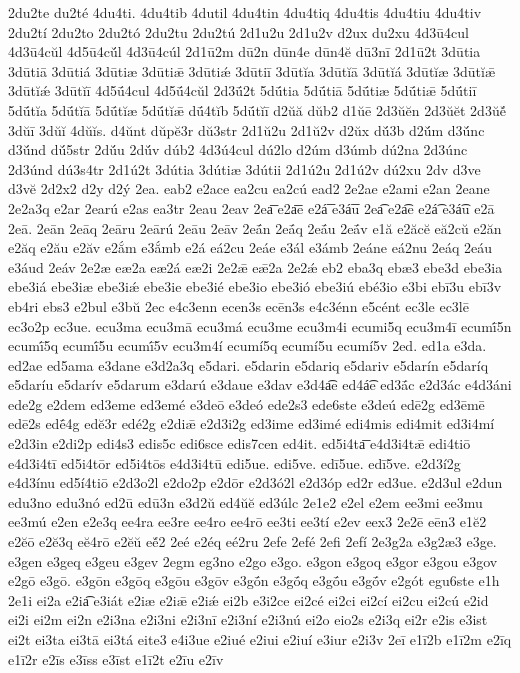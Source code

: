 {2du2te
du2té
4du4ti.
4du4tib
4dutil
4du4tin
4du4tiq
4du4tis
4du4tiu
4du4tiv
2du2tí
2du2to
2du2tó
2du2tu
2du2tú
2d1u2u
2d1u2v
d2ux
du2xu
4d3ū4cul
4d3ū4cŭl
4d5ū4cŭ́l
4d3ū4cúl
2d1ū2m
dū2n
dūn4e
dūn4ĕ
dū3nī
2d1ū2t
3dūtia
3dūtiā
3dūtiá
3dūtiæ
3dūtiǣ
3dūtiǽ
3dūtiī
3dūtĭa
3dūtĭā
3dūtĭá
3dūtĭæ
3dūtĭǣ
3dūtĭǽ
3dūtĭī
4d5ū́4cul
4d5ū́4cŭl
2d3ū́2t
5dū́tia
5dū́tiā
5dū́tiæ
5dū́tiǣ
5dū́tiī
5dū́tĭa
5dū́tĭā
5dū́tĭæ
5dū́tĭǣ
dū́4tĭb
5dū́tĭī
d2ŭă
dŭb2
d1ŭē
2d3ŭĕn
2d3ŭĕt
2d3ŭĕ́
3dŭī
3dŭĭ
4dŭĭs.
d4ŭnt
dŭpĕ3r
dŭ3str
2d1ŭ2u
2d1ŭ2v
d2ŭx
dŭ́3b
d2ŭ́m
d3ŭ́nc
d3ŭ́nd
dŭ́5str
2dŭ́u
2dŭ́v
dúb2
4d3ú4cul
dú2lo
d2úm
d3úmb
dú2na
2d3únc
2d3únd
dú3s4tr
2d1ú2t
3dútia
3dútiæ
3dútii
2d1ú2u
2d1ú2v
dú2xu
2dv
d3ve
d3vĕ
2d2x2
d2y
d2ý
2ea.
eab2
e2ace
ea2cu
ea2cú
ead2
2e2ae
e2ami
e2an
2eane
2e2a3q
e2ar
2earú
e2as
ea3tr
2eau
2eav
2ea͞
e2a͞e
e2á͞
e3á͞u
2ea͡
e2a͡e
e2á͡
e3á͡u
e2ā
2eā.
2eān
2eāq
2eāru
2eārú
2eāu
2eāv
2eā́n
2eā́q
2eā́u
2eā́v
e1ă
e2ăcĕ
eă2cŭ
e2ăn
e2ăq
e2ău
e2ăv
e2ắm
e3ắmb
e2á
eá2cu
2eáe
e3ál
e3ámb
2eáne
eá2nu
2eáq
2eáu
e3áud
2eáv
2e2æ
eæ2a
eæ2á
eæ2i
2e2ǣ
eǣ2a
2e2ǽ
eb2
eba3q
ebæ3
ebe3d
ebe3ia
ebe3iá
ebe3iæ
ebe3iǽ
ebe3ie
ebe3ié
ebe3io
ebe3ió
ebe3iú
ebé3io
e3bi
ebī3u
ebī3v
eb4ri
ebs3
e2bul
e3bŭ
2ec
e4c3enn
ecen3s
ecēn3s
e4c3énn
e5cént
ec3le
ec3lē
ec3o2p
ec3ue.
ecu3ma
ecu3mā
ecu3má
ecu3me
ecu3m4i
ecumi5q
ecu3m4ī
ecumī́5n
ecumī́5q
ecumī́5u
ecumī́5v
ecu3m4í
ecumí5q
ecumí5u
ecumí5v
2ed.
ed1a
e3da.
ed2ae
ed5ama
e3dane
e3d2a3q
e5dari.
e5darin
e5dariq
e5dariv
e5darín
e5daríq
e5daríu
e5darív
e5darum
e3darú
e3daue
e3dav
e3d4a͡e
ed4á͡e
ed3ā́c
e2d3ác
e4d3áni
ede2g
e2dem
ed3eme
ed3emé
e3deō
e3deó
ede2s3
ede6ste
e3deú
edē2g
ed3ēmē
edē2s
edḗ4g
edĕ3r
edé2g
e2diǣ
e2d3i2g
ed3ime
ed3imé
edi4mis
edi4mit
ed3i4mí
e2d3in
e2di2p
edi4s3
edis5c
edi6sce
edis7cen
ed4it.
ed5i4ta͞
e4d3i4tǣ
edi4tiō
e4d3i4tī
ed5i4tōr
ed5i4tōs
e4d3i4tū
edi5ue.
edi5ve.
edī5ue.
edī5ve.
e2d3í2g
e4d3ínu
ed5í4tiō
e2d3o2l
e2do2p
e2dōr
e2d3ó2l
e2d3óp
ed2r
ed3ue.
e2d3ul
e2dun
edu3no
edu3nó
ed2ū
edū3n
e3d2ŭ
ed4ŭĕ
ed3úlc
2e1e2
e2el
e2em
ee3mi
ee3mu
ee3mú
e2en
e2e3q
ee4ra
ee3re
ee4ro
ee4rō
ee3ti
ee3tí
e2ev
eex3
2e2ē
eēn3
e1ĕ2
e2ĕō
e2ĕ3q
eĕ4rō
e2ĕŭ
eĕ́2
2eé
e2éq
eé2ru
2efe
2efé
2efi
2efí
2e3g2a
e3g2æ3
e3ge.
e3gen
e3geq
e3geu
e3gev
2egm
eg3no
e2go
e3go.
e3gon
e3goq
e3gor
e3gou
e3gov
e2gō
e3gō.
e3gōn
e3gōq
e3gōu
e3gōv
e3gṓn
e3gṓq
e3gṓu
e3gṓv
e2gót
egu6ste
e1h
2e1i
ei2a
e2ia͡
e3iát
e2iæ
e2iǣ
e2iǽ
ei2b
e3i2ce
ei2cé
ei2ci
ei2cí
ei2cu
ei2cú
e2id
ei2i
ei2m
ei2n
e2i3na
e2i3ni
e2i3nī
e2i3ní
e2i3nú
ei2o
eio2s
e2i3q
ei2r
e2is
e3ist
ei2t
ei3ta
ei3tā
ei3tá
eite3
e4i3ue
e2iué
e2iui
e2iuí
e3iur
e2i3v
2eī
e1ī2b
e1ī2m
e2īq
e1ī2r
e2īs
e3īss
e3īst
e1ī2t
e2īu
e2īv
}

